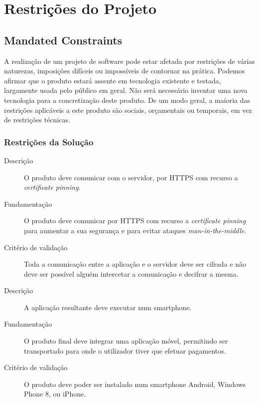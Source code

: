 \documentclass{article}
\begin{document}
\newpage

\section{Restrições do Projeto}
  
  \subsection{Mandated Constraints}

    A realização de um projeto de software pode estar afetada por restrições de várias naturezas, imposições difíceis ou impossíveis de contornar na prática. Podemos afirmar que o produto estará assente em tecnologia existente e testada, largamente usada pelo público em geral. Não será necessário inventar uma nova tecnologia para a concretização deste produto. De um modo geral, a maioria das restrições aplicáveis a este produto são sociais, orçamentais ou temporais, em vez de restrições técnicas.

    \subsubsection{Restrições da Solução}

      \begin{description}
        \item[Descrição]O produto deve comunicar com o servidor, por HTTPS com recurso a \emph{certificate pinning}.
        \item[Fundamentação]O produto deve comunicar por HTTPS com recurso a \emph{certificate pinning} para aumentar a sua segurança e para evitar ataques \emph{man-in-the-middle}.
        \item[Critério de validação]Toda a comunicação entre a aplicação e o servidor deve ser cifrada e não deve ser possível alguém intercetar a comunicação e decifrar a mesma.
      \end{description}

\vspace{0.7cm}

      \begin{description}
        \item[Descrição]A aplicação resultante deve executar num smartphone.
        \item[Fundamentação]O produto final deve integrar uma aplicação móvel, permitindo ser transportado para onde o utilizador tiver que efetuar pagamentos.
        \item[Critério de validação]O produto deve poder ser instalado num smartphone Android, Windows Phone 8, ou iPhone.
      \end{description}
\vspace{0.7cm}
\end{document}
